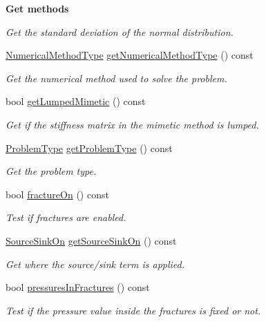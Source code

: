 \begin{Indent}{\bf Get methods}
\begin{DoxyCompactItemize}
\begin{DoxyCompactList}\small\item\em Get the standard deviation of the normal distribution. \end{DoxyCompactList}\item 
\hyperlink{classFVCode3D_1_1Data_a5222e1901276af4586befd821445c6cf}{Numerical\+Method\+Type} \hyperlink{classFVCode3D_1_1Data_a1210f9a0ed0551f974b8ff05625d9863}{get\+Numerical\+Method\+Type} () const 
\begin{DoxyCompactList}\small\item\em Get the numerical method used to solve the problem. \end{DoxyCompactList}\item 
bool \hyperlink{classFVCode3D_1_1Data_a8630fc70df08884669e43f21a5975cf6}{get\+Lumped\+Mimetic} () const 
\begin{DoxyCompactList}\small\item\em Get if the stiffness matrix in the mimetic method is lumped. \end{DoxyCompactList}\item 
\hyperlink{classFVCode3D_1_1Data_af17933074f5acdb699179763e6f43f23}{Problem\+Type} \hyperlink{classFVCode3D_1_1Data_aa23de9b3d8c9e07241b658e0f62ee851}{get\+Problem\+Type} () const 
\begin{DoxyCompactList}\small\item\em Get the problem type. \end{DoxyCompactList}\item 
bool \hyperlink{classFVCode3D_1_1Data_a941e81f94c9cac5f8b53736768d8b841}{fracture\+On} () const 
\begin{DoxyCompactList}\small\item\em Test if fractures are enabled. \end{DoxyCompactList}\item 
\hyperlink{classFVCode3D_1_1Data_a4d66e2e205b350cb240820540339e1a3}{Source\+Sink\+On} \hyperlink{classFVCode3D_1_1Data_a50d977227499b2a9d8e877583718c783}{get\+Source\+Sink\+On} () const 
\begin{DoxyCompactList}\small\item\em Get where the source/sink term is applied. \end{DoxyCompactList}\item 
bool \hyperlink{classFVCode3D_1_1Data_a4e2f0001c574c8d50359a231ef079fcc}{pressures\+In\+Fractures} () const 
\begin{DoxyCompactList}\small\item\em Test if the pressure value inside the fractures is fixed or not. \end{DoxyCompactList}\item 

\end{DoxyCompactItemize}
\end{Indent}
